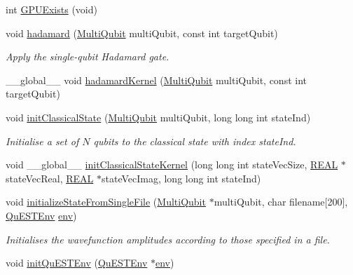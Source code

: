 \begin{DoxyCompactItemize}
int \mbox{\hyperlink{QuEST__env__localGPU_8cu_a0aabd5ed69a74e5bc0b46a17af45c886}{G\+P\+U\+Exists}} (void)
\item 
void \mbox{\hyperlink{QuEST__env__localGPU_8cu_aa09b5dd93de6df1384b8f2c0041749ab}{hadamard}} (\mbox{\hyperlink{structMultiQubit}{Multi\+Qubit}} multi\+Qubit, const int target\+Qubit)
\begin{DoxyCompactList}\small\item\em Apply the single-\/qubit Hadamard gate. \end{DoxyCompactList}\item 
\+\_\+\+\_\+global\+\_\+\+\_\+ void \mbox{\hyperlink{QuEST__env__localGPU_8cu_aca19ea42f8ff8d21871394db3a7a2a2a}{hadamard\+Kernel}} (\mbox{\hyperlink{structMultiQubit}{Multi\+Qubit}} multi\+Qubit, const int target\+Qubit)
\item 
void \mbox{\hyperlink{QuEST__env__localGPU_8cu_ae1b983b41249836ed2c2a81f77d83c40}{init\+Classical\+State}} (\mbox{\hyperlink{structMultiQubit}{Multi\+Qubit}} multi\+Qubit, long long int state\+Ind)
\begin{DoxyCompactList}\small\item\em Initialise a set of $ N $ qubits to the classical state with index {\ttfamily state\+Ind}. \end{DoxyCompactList}\item 
void \+\_\+\+\_\+global\+\_\+\+\_\+ \mbox{\hyperlink{QuEST__env__localGPU_8cu_a5ffdb83d58185c1caf2ef0675d9c4ad6}{init\+Classical\+State\+Kernel}} (long long int state\+Vec\+Size, \mbox{\hyperlink{QuEST__precision_8h_a4b654506f18b8bfd61ad2a29a7e38c25}{R\+E\+AL}} $\ast$state\+Vec\+Real, \mbox{\hyperlink{QuEST__precision_8h_a4b654506f18b8bfd61ad2a29a7e38c25}{R\+E\+AL}} $\ast$state\+Vec\+Imag, long long int state\+Ind)
\item 
void \mbox{\hyperlink{QuEST__env__localGPU_8cu_a433876ee9f3bcc54af346300f571fc3c}{initialize\+State\+From\+Single\+File}} (\mbox{\hyperlink{structMultiQubit}{Multi\+Qubit}} $\ast$multi\+Qubit, char filename\mbox{[}200\mbox{]}, \mbox{\hyperlink{structQuESTEnv}{Qu\+E\+S\+T\+Env}} \mbox{\hyperlink{runTests_8c_a5fd8ba97fcae3408ae6221dfc3cc1f93}{env}})
\begin{DoxyCompactList}\small\item\em Initialises the wavefunction amplitudes according to those specified in a file. \end{DoxyCompactList}\item 
void \mbox{\hyperlink{QuEST__env__localGPU_8cu_ad84a3ce68d1ca02b4e3f741ea45b6054}{init\+Qu\+E\+S\+T\+Env}} (\mbox{\hyperlink{structQuESTEnv}{Qu\+E\+S\+T\+Env}} $\ast$\mbox{\hyperlink{runTests_8c_a5fd8ba97fcae3408ae6221dfc3cc1f93}{env}})

\end{DoxyCompactItemize}
